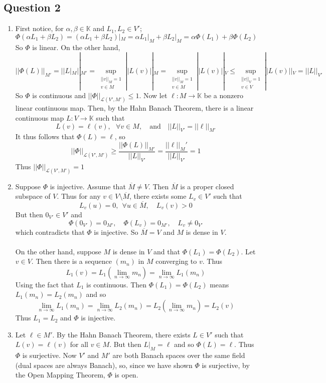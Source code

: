 \documentclass[letterpaper, 11pt]{article}
\newcommand{\1}{\mathds{1}}	%
\theoremstyle{definition}
\begin{document}
\subsection*{Question 2}
\begin{enumerate}
\item[(a)] First notice, for $\alpha, \beta \in \mathbb{K}$ and $L_1, L_2 \in V'$; \[
\Phi(\alpha L_1 + \beta L_2) = (\alpha L_1 + \beta L_2)|_M = \alpha L_1 |_M + \beta L_2|_M = \alpha \Phi(L_1) + \beta \Phi (L_2)
\]
So $\Phi$ is linear. On the other hand, \[
||\Phi(L)||_{M'} = || L|_M ||_{M'} = \sup \limits _{\substack{||v||_M = 1 \\ v \in M}} ||L(v)||_M = \sup \limits _{\substack{||v||_M = 1 \\ v \in M}} ||L(v)||_V \le  \sup \limits _{\substack{||v||_V = 1 \\ v \in V}} ||L(v)||_V  = ||L||_{V'}
\]
So $\Phi$ is continuous and $||\Phi||_{\mathcal{L}(V', M')} \le 1$. Now let $\ell: M \to \mathbb{K}$ be a nonzero linear continuous map. Then, by the Hahn Banach Theorem, there is a linear continuous map $L: V \to \mathbb{K}$ such that \[
L(v) = \ell (v), \ \ \ \forall v \in M, \quad \text{and} \quad ||L||_{V'} = ||\ell||_{M'}
\]
It thus follows that $\Phi (L) = \ell$, so \[
||\Phi||_{\mathcal{L}(V', M')} \ge \frac{||\Phi(L)||_{M'}}{||L||_{V'}} = \frac{||\ell ||_M'}{||L||_{V'}} = 1
\]
Thus $||\Phi ||_{\mathcal{L}(V', M')} = 1$

\item[(b)] Suppose $\Phi$ is injective. Assume that $\overline{M} \ne V$. Then $\overline{M}$ is a proper closed subspace of $V$. Thus for any $v \in V \setminus \overline{M}$, there exists some $L_v \in V'$ such that \[
L_v(u) = 0, \ \ \forall u \in \overline{M}, \quad L_v(v) > 0 
\]
But then $0_{V'} \in V'$ and \[
\Phi(0_{V'}) = 0_{M'}, \quad \Phi(L_v) = 0_{M'}, \quad L_v \ne 0_{V'}
\]
which contradicts that $\Phi$ is injective. So $\overline{M} = V$ and $M$ is dense in $V$. ~\\ ~\\On the other hand, suppose $M$ is dense in $V$ and that $\Phi(L_1) = \Phi(L_2)$. Let $v \in V$. Then there is a sequence $(m_n)$ in $M$ converging to $v$. Thus \[
L_1(v) = L_1 \left (\lim \limits _{n \to \infty} m_n \right) = \lim \limits _{n \to \infty} L_1(m_n)
\]
Using the fact that $L_1$ is continuous. Then $\Phi(L_1) = \Phi(L_2)$ means $L_1(m_n) = L_2(m_n)$ and so \[
\lim \limits _{n \to \infty} L_1(m_n) = \lim \limits _{n \to \infty} L_2(m_n) = L_2 \left (\lim \limits _{n \to \infty} m_n \right) = L_2 (v)
\]
Thus $L_1 = L_2$ and $\Phi$ is injective.

\item [(c)] Let $\ell \in M'$. By the Hahn Banach Theorem, there exists $L \in V'$ such that $L(v) = \ell (v)$ for all $v \in M$. But then $L|_M = \ell$ and so $\Phi(L) = \ell$. Thus $\Phi$ is surjective. Now $V'$ and $M'$ are both Banach spaces over the same field (dual spaces are always Banach), so, since we have shown $\Phi$ is surjective, by the Open Mapping Theorem, $\Phi$ is open.
\end{enumerate}
\end{document}
